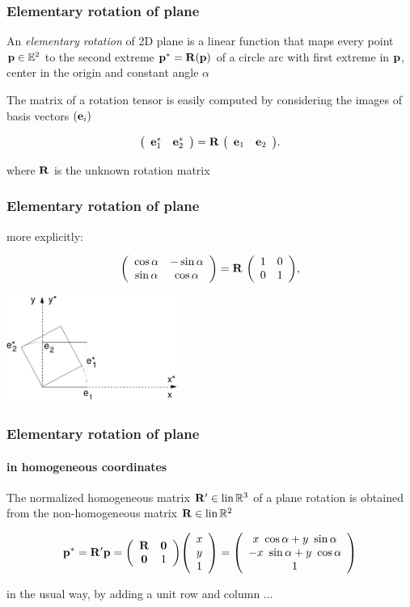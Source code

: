 \documentclass{beamer}
\begin{document}
\begin{frame}\frametitle{Elementary rotation of plane}\small

\vfill

An \emph{elementary rotation} of 2D plane is a linear function that maps every point ${\bf p}\in \mathbb{E}^{2}$ to the second extreme ${\bf p}^{*}= {\bf R}({\bf p})$ of a circle arc with first extreme in ${\bf p}$,  center in the origin and constant angle $\alpha$

\vfill

The matrix of a rotation tensor is easily computed by considering the images of basis vectors $({\bf e}_i)$

\vfill

\[
{\left(\begin{array}{cccccccccccccccccccccccccccc}
{\bf e}_1^* & {\bf e}_2^* \end{array}\right)}
=
{\bf R}\ {\left(\begin{array}{cccccccccccccccccccccccccccc}
{\bf e}_1 & {\bf e}_2  \end{array}\right)}.
\]
\vfill

where ${\bf R}$ is the unknown rotation matrix 
\end{frame}
\begin{frame}\frametitle{Elementary rotation of plane}

\vfill

more explicitly:

\[
{\left(\begin{array}{cccccccccccccccccccccccccccc}
\cos\alpha & -\sin\alpha \\
\sin\alpha & \cos\alpha \end{array}\right)}
=
{\bf R}\ {\left(\begin{array}{cccccccccccccccccccccccccccc}
1 & 0 \\
0 & 1  \end{array}\right)},
\]

\vfill
\centering\includegraphics[height=35mm]{images/rot2D}
\vfill
\end{frame}
\begin{frame}\frametitle{Elementary rotation of plane}
\framesubtitle{in homogeneous coordinates}

\vfill
The normalized homogeneous matrix ${\bf R}' \in \mbox{\rm lin}\, \mathbb{R}^3$ of a plane rotation is obtained from the non-homogeneous matrix ${\bf R}\in \mbox{\rm lin}\, \mathbb{R}^2$

\vfill

\[
{\bf p}^* =
{\bf R}'{\bf p} =
{\left(\begin{array}{cccccccccccccccccccccccccccc}
{\bf R} & {\bf 0}\\
{\bf 0} &  1
\end{array}\right)}
{\left(\begin{array}{cccccccccccccccccccc}x \\ y \\ 1\end{array}\right)}
=
{\left(\begin{array}{cccccccccccccccccccc}x\ \cos\alpha+y\ \sin\alpha \\ -x\ \sin\alpha + y\ \cos\alpha \\ 1\end{array}\right)} 
\]
\vfill

in the usual way, by adding a unit row and column ...
 
\vfill
\end{frame}
\end{document}
